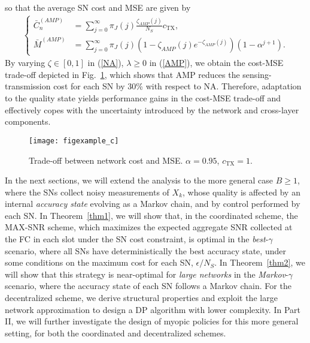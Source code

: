\documentclass[10pt,twocolumn,twoside]{IEEEtran}
\theoremstyle{plain}
\begin{document}
so that  the average SN cost and MSE
 are given by
 \begin{align*}
 \left\{
\begin{array}{ll}
\!\!\!\!\bar C_n^{(AMP)}&\!\!\!\!\!\!=\!
\sum_{j=0}^{\infty}\pi_J(j)\frac{\zeta_{AMP}(j)}{N_S}c_{\mathrm{TX}},\\
\!\!\!\!\bar M^{(AMP)}&\!\!\!\!\!\!=\!
\sum_{j=0}^{\infty}\pi_J(j)(1-\zeta_{AMP}(j) e^{-\zeta_{AMP}(j)})(1\!-\!\alpha^{j+1}).\!
\end{array}\right.
 \end{align*}
 By varying $\zeta{\in}[0,1]$ in (\ref{NA}), $\lambda{\geq}0$ in (\ref{AMP}), we obtain
  the cost-MSE  trade-off depicted in Fig.~\ref{TOYEX},
 which shows that AMP reduces the sensing-transmission cost for each SN by 30\% with respect to NA.
 Therefore,
  adaptation
 to the quality state yields performance gains in the cost-MSE trade-off and 
 effectively copes with the uncertainty introduced by the network and cross-layer components.
 
 \begin{figure}[t]
\centering
\texttt{[image: figexample\_c]}
\vspace{-3mm}
\caption{Trade-off between network cost and MSE. $\alpha=0.95$, $c_{\mathrm{TX}}=1$.}\label{TOYEX}
\vspace{-5mm}
\end{figure}


In the next sections, we will extend the analysis to the more general case $B{\geq}1$,
where the SNs collect noisy measurements of $X_k$, whose quality is affected by an internal \emph{accuracy state} evolving as a Markov chain,
and by control performed by each SN.
In Theorem~\ref{thm1},
we will show that,
in the coordinated scheme,
 the MAX-SNR scheme, which maximizes the 
expected aggregate SNR collected at the FC in each slot under the SN cost constraint,
is optimal in the \emph{best}-$\gamma$  scenario, where
all SNs have deterministically the best accuracy state,
under some conditions on the maximum cost for each SN, $\epsilon/N_S$.
In Theorem~\ref{thm2}, we will show that this strategy is near-optimal for \emph{large networks} in the \emph{Markov}-$\gamma$ scenario,
where the accuracy state of each SN follows a Markov chain.
For the decentralized scheme, we derive structural properties
and exploit the large network approximation to design a DP algorithm with lower complexity. 
In Part II, we will further investigate the design of myopic policies for this more general setting,
for both the coordinated and decentralized schemes.
\end{document}
